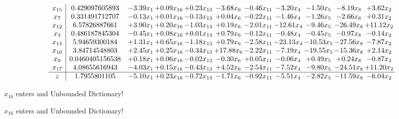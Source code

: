\documentclass[9pt]{article}
\begin{document}
 \[\begin{array}{c| c c@{\hskip 2pt} c@{\hskip 2pt} c@{\hskip 2pt} c@{\hskip 2pt} c@{\hskip 2pt} c@{\hskip 2pt} c@{\hskip 2pt} c@{\hskip 2pt} c@{\hskip 2pt} }
 x_{15}   &  0.429097605893 & -3.39 x_{1} & +  0.09 x_{16} & +  0.23 x_{13} & -3.68 x_{6} & -0.46 x_{11} & -3.20 x_{4} & -1.50 x_{5} & -8.19 x_{8} & +  3.62 x_{2}\\
 x_{7}   &  0.331491712707 & -0.13 x_{1} & +  0.01 x_{16} & -0.13 x_{13} & +  0.04 x_{6} & -0.22 x_{11} & -1.46 x_{4} & -1.26 x_{5} & -2.66 x_{8} & +  0.31 x_{2}\\
 x_{12}   &  6.57826887661 & +  3.90 x_{1} & +  0.20 x_{16} & -1.03 x_{13} & +  0.19 x_{6} & -2.01 x_{11} & -12.61 x_{4} & -9.46 x_{5} & -26.49 x_{8} & + 11.12 x_{2}\\
 x_{3}   &  0.486187845304 & -0.45 x_{1} & +  0.08 x_{16} & +  0.01 x_{13} & +  0.79 x_{6} & -0.12 x_{11} & -0.48 x_{4} & -0.45 x_{5} & -0.97 x_{8} & -0.14 x_{2}\\
 x_{14}   &  5.94659300184 & +  1.31 x_{1} & +  0.65 x_{16} & -1.18 x_{13} & +  0.79 x_{6} & -2.58 x_{11} & -23.13 x_{4} & -10.53 x_{5} & -27.56 x_{8} & -7.87 x_{2}\\
 x_{10}   &  3.84714548803 & +  2.45 x_{1} & +  0.25 x_{16} & -0.34 x_{13} & + 17.88 x_{6} & -2.22 x_{11} & -7.19 x_{4} & -19.55 x_{5} & -15.36 x_{8} & +  2.14 x_{2}\\
 x_{9}   &  0.0460405156538 & +  0.18 x_{1} & +  0.06 x_{16} & -0.02 x_{13} & -0.30 x_{6} & +  0.05 x_{11} & -0.06 x_{4} & +  0.49 x_{5} & +  0.24 x_{8} & -0.87 x_{2}\\
 x_{17}   &  4.08655616943 & -4.03 x_{1} & +  0.15 x_{16} & -0.43 x_{13} & +  4.52 x_{6} & -2.54 x_{11} & -7.52 x_{4} & -9.80 x_{5} & -24.51 x_{8} & + 11.20 x_{2}\\
\hline
z    &  1.7955801105 & -5.10 x_{1} & +  0.23 x_{16} & -0.72 x_{13} & -1.71 x_{6} & -0.92 x_{11} & -5.51 x_{4} & -2.82 x_{5} & -11.59 x_{8} & -6.04 x_{2}\\
\end{array}\]


 $ x_{16} $ enters and Unbounded Dictionary!


 $ x_{16} $ enters and Unbounded Dictionary!
\end{document}
